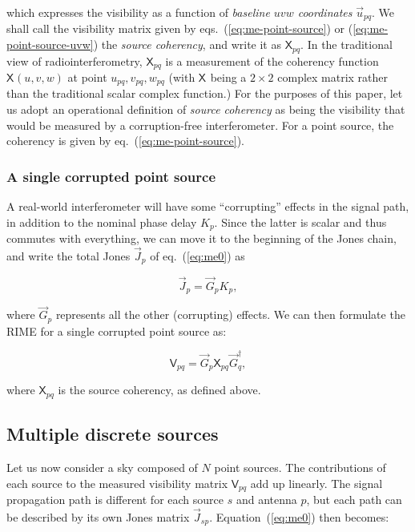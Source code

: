 \documentclass[]{aa}
\newcommand{\jones}[2]{\vec {#1}_{#2}}
\newcommand{\jonesT}[2]{\vec {#1}^\dagger_{#2}}
\newcommand{\coh}[2]{\mathsf{{#1}}_{{#2}}}
\begin{document}
which expresses the visibility as a function of {\em baseline $uvw$ coordinates} $\vec u_{pq}$. We shall call the visibility matrix given by eqs.~(\ref{eq:me-point-source}) or (\ref{eq:me-point-source-uvw}) the {\em source coherency}, and write it as $\coh{X}{pq}$. In the traditional view of radiointerferometry, $\coh{X}{pq}$ is a measurement of the coherency function $\coh{X}{}(u,v,w)$ at point $u_{pq},v_{pq},w_{pq}$ (with $\coh{X}{}$ being a $2\times2$ complex matrix rather than the traditional scalar complex function.) For the purposes of this paper, let us adopt an operational definition of {\em source coherency} as being the visibility that would be measured by a corruption-free interferometer. For a point source, the coherency is given by eq.~(\ref{eq:me-point-source}).

\subsubsection{A single corrupted point source}

A real-world interferometer will have some ``corrupting'' effects in the signal path, in addition to the nominal phase delay $K_p$. Since the latter is scalar and thus commutes with everything, we can move it to the beginning of the Jones chain, and write the total Jones $\jones{J}{p}$ of eq.~(\ref{eq:me0}) as

\[
\jones{J}{p} = \jones{G}{p} K_p,
\]

where $\jones{G}{p}$ represents all the other (corrupting) effects. We can then formulate the RIME for a single corrupted point source as:

  \begin{equation}\label{eq:me-point-source-corrupted}
  \coh{V}{pq} = \jones{G}{p} \coh{X}{pq} \jonesT{G}{q},
  \end{equation}

where $\coh{X}{pq}$ is the source coherency, as defined above.
 

\subsection{Multiple discrete sources}

Let us now consider a sky composed of $N$ point sources. The contributions of each source to the measured visibility matrix $\coh{V}{pq}$ add up linearly. The signal propagation path is different for each source $s$ and antenna $p$, but each path can be described by its own Jones matrix $\jones{J}{sp}$. Equation~(\ref{eq:me0}) then becomes:
\end{document}
